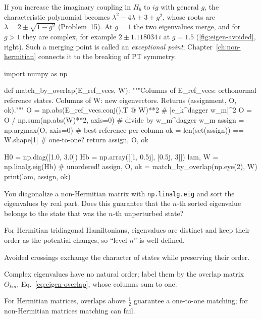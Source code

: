 If you increase the imaginary coupling in $H_b$ to $ig$ with general $g$, the characteristic polynomial becomes $\lambda^2-4\lambda+3+g^2$, whose roots are $\lambda=2\pm\sqrt{1-g^2}$ (Problem~15). At $g=1$ the two eigenvalues merge, and for $g>1$ they are complex, for example $2\pm1.118034\,i$ at $g=1.5$ (\cref{fig:eigen-avoided}, right). Such a merging point is called an \emph{exceptional point}; Chapter~\ref{ch:non-hermitian} connects it to the breaking of PT symmetry.

\begin{pycode}
import numpy as np

def match_by_overlap(E_ref_vecs, W):
    """Columns of E_ref_vecs: orthonormal reference states.
    Columns of W: new eigenvectors. Returns (assignment, O, ok)."""
    O = np.abs(E_ref_vecs.conj().T @ W)**2          # |e_k^dagger w_m|^2
    O = O / np.sum(np.abs(W)**2, axis=0)             # divide by w_m^dagger w_m
    assign = np.argmax(O, axis=0)                    # best reference per column
    ok = len(set(assign)) == W.shape[1]              # one-to-one?
    return assign, O, ok

H0 = np.diag([1.0, 3.0])
Hb = np.array([[1, 0.5j], [0.5j, 3]])
lam, W = np.linalg.eig(Hb)                           # unordered!
assign, O, ok = match_by_overlap(np.eye(2), W)
print(lam, assign, ok)
\end{pycode}

\begin{checkpoint}
You diagonalize a non-Hermitian matrix with \texttt{np.linalg.eig} and sort the eigenvalues by real part. Does this guarantee that the $n$-th sorted eigenvalue belongs to the state that was the $n$-th unperturbed state?
\end{checkpoint}

\begin{keyideas}
\item For Hermitian tridiagonal Hamiltonians, eigenvalues are distinct and keep their order as the potential changes, so ``level $n$'' is well defined.
\item Avoided crossings exchange the character of states while preserving their order.
\item Complex eigenvalues have no natural order; label them by the overlap matrix $O_{km}$, Eq.~\eqref{eq:eigen-overlap}, whose columns sum to one.
\item For Hermitian matrices, overlaps above $\tfrac12$ guarantee a one-to-one matching; for non-Hermitian matrices matching can fail.
\end{keyideas}

